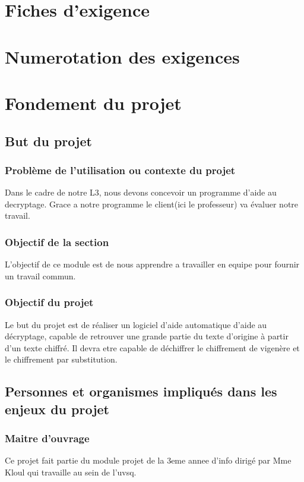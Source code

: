 \documentclass[a4]{article}
\begin{document}
		\section{Fiches d'exigence}
				 
	\section{Numerotation des exigences}
				 
		
	\section{Fondement du projet}
		\subsection{But du projet} 
			\subsubsection{Problème de l'utilisation ou contexte du projet}
				Dans le cadre de notre L3, nous devons concevoir un programme d'aide au decryptage.
				Grace a notre programme le client(ici le professeur) va évaluer notre travail.
			\subsubsection{Objectif de la section}
				L'objectif de ce module est de nous apprendre a travailler en equipe pour fournir un travail 					commun.
			\subsubsection{Objectif du projet}
				Le but du projet est de réaliser un logiciel d'aide automatique d'aide au décryptage, capable de retrouver une 					grande partie du texte d'origine à partir d'un texte chiffré. Il devra etre capable de 					déchiffrer le chiffrement de vigenère et le chiffrement par substitution.
		\subsection{Personnes et organismes impliqués dans les enjeux du projet} 
			\subsubsection{Maitre d'ouvrage}
				Ce projet fait partie du module projet de la 3eme annee d'info dirigé par Mme Kloul qui 				travaille au sein de l'uvsq.			
\end{document}
